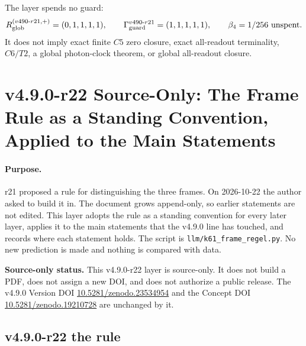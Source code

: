 The layer spends no guard:
\[
R_{\rm glob}^{(v490\text{-}r21,+)}=(0,1,1,1,1),
\qquad
\Gamma_{\rm guard}^{v490\text{-}r21}=(1,1,1,1,1),
\qquad
\beta_4=1/256\ \text{unspent}.
\]
It does not imply exact finite \(C5\) zero closure, exact all-readout terminality,
\(C6/T2\), a global photon-clock theorem, or global all-readout closure.

\clearpage
\section*{v4.9.0-r22 Source-Only: The Frame Rule as a Standing Convention, Applied to the Main Statements}
\label{sec:v490-r22-frame-rule}

\paragraph{Purpose.}
r21 proposed a rule for distinguishing the three frames.  On 2026-10-22 the author asked to build it in.  The document grows
append-only, so earlier statements are not edited.  This layer adopts the rule as a standing convention for every later layer,
applies it to the main statements that the v4.9.0 line has touched, and records where each statement holds.  The script is
\texttt{llm/k61\_frame\_regel.py}.  No new prediction is made and nothing is compared with data.

\noindent\textbf{Source-only status.}
This v4.9.0-r22 layer is source-only.  It does not build a PDF, does not assign a new DOI,
and does not authorize a public release.  The v4.9.0 Version DOI
\href{https://doi.org/10.5281/zenodo.23534954}{10.5281/zenodo.23534954} and the Concept DOI
\href{https://doi.org/10.5281/zenodo.19210728}{10.5281/zenodo.19210728} are unchanged by it.

\subsection*{v4.9.0-r22 the rule}
\label{subsec:v490-r22-rule}

